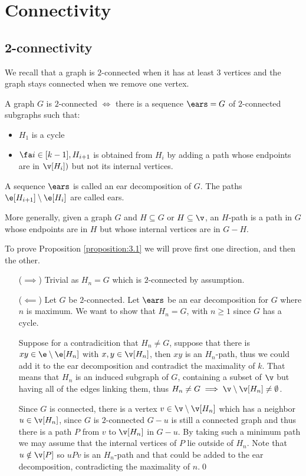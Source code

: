 \chapter{Connectivity}
\section{2-connectivity}
We recall that a graph is $2$-connected when it has at least $3$ vertices and the graph stays connected when we remove one vertex.
\begin{customproposition}{3.1}
\label{proposition:3.1}
    A graph $G$ is $2$-connected $\iff$ there is a sequence $\ears = G$ of $2$-connected subgraphs such that:
    \begin{itemize}
        \item $H_1$ is a cycle
        \item $\fa i \in [k - 1], H_{i + 1}$ is obtained from $H_i$ by adding a path whose endpoints are in $\v[H_i])$ but not its internal vertices.
    \end{itemize}
\end{customproposition}
\begin{definition}[Ears]
    A sequence $\ears$ is called an ear decomposition of $G$. The paths $\e[H_{i + 1}] \setminus \e[H_i]$ are called ears.
\end{definition}
More generally, given a graph $G$ and $H \subseteq G$ or $H \subseteq \v$, an $H$-path is a path in $G$ whose endpoints are in $H$ but whose internal vertices are in $G-H$.
\begin{prf}
    To prove Proposition \ref{proposition:3.1} we will prove first one direction, and then the other.
    \begin{itemize}
        \item [($\implies$)] Trivial as $H_n = G$ which is $2$-connected by assumption.
        \item [($\impliedby$)] Let $G$ be $2$-connected. Let $\ears$ be an ear decomposition for $G$ where $n$ is maximum. We want to show that $H_n = G$, with $n \geq 1$ since $G$ has a cycle.
        
        Suppose for a contradicition that $H_n \neq G$, suppose that there is $xy \in \e \setminus \e[H_n]$ with $x, y \in \v[H_n]$, then $xy$ is an $H_n$-path, thus we could add it to the ear decomposition and contradict the maximality of $k$. That means that $H_n$ is an induced subgraph of $G$, containing a subset of $\v$ but having all of the edges linking them, thus $H_n \neq G \implies \v \setminus \v[H_n] \neq \emptyset$.

        Since $G$ is connected, there is a vertex $v \in \v \setminus \v[H_n]$ which has a neighbor $u \in \v[H_n]$, since $G$ is $2$-connected $G - u$ is still a connected graph and thus there is a path $P$ from $v$ to $\v[H_n]$ in $G - u$. By taking such a minimum path we may assume that the internal vertices of $P$ lie outside of $H_n$. Note that $u \notin \v[P]$ so $uPv$ is an $H_n$-path and that could be added to the ear decomposition, contradicting the maximality of $n$.\qed
    \end{itemize}
\end{prf}
